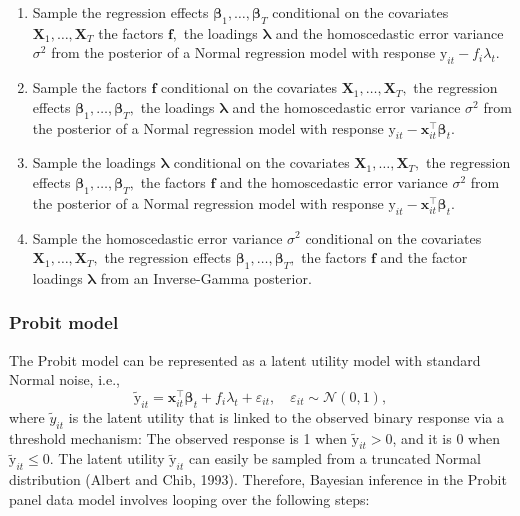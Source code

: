\documentclass[a4paper, preprint, 3p,
authoryear]{elsarticle} %
\begin{document}
\begin{enumerate}
    \item Sample the regression effects $\boldsymbol{\beta}_1,\dots,\boldsymbol{\beta}_T$ conditional on the covariates $\textbf{X}_1,\dots,\textbf{X}_T$ the factors $\mathbf{f},$ the loadings $\boldsymbol{\lambda}$ and the homoscedastic error variance $\sigma^2$ from the posterior of a Normal regression model with response $\text{y}_{it}-f_i\lambda_t.$
    \item Sample the factors $\mathbf{f}$ conditional on the covariates $\textbf{X}_1,\dots,\textbf{X}_T,$ the regression effects $\boldsymbol{\beta}_1,\dots,\boldsymbol{\beta}_T,$ the loadings $\boldsymbol{\lambda}$ and the homoscedastic error variance $\sigma^2$ from the posterior of a Normal regression model with response  $\text{y}_{it}-\textbf{x}_{it}^\top \boldsymbol{\beta}_t$.
    \item Sample the loadings $\boldsymbol{\lambda}$ conditional on the covariates $\textbf{X}_1,\dots,\textbf{X}_T,$ the regression effects $\boldsymbol{\beta}_1,\dots,\boldsymbol{\beta}_T,$ the factors $\mathbf{f}$ and the homoscedastic error variance $\sigma^2$ from the posterior of a Normal regression model with response  $\text{y}_{it}-\textbf{x}_{it}^\top \boldsymbol{\beta}_t.$
     \item Sample the homoscedastic error variance $\sigma^2$ conditional on the covariates $\textbf{X}_1,\dots,\textbf{X}_T,$ the regression effects $\boldsymbol{\beta}_1,\dots,\boldsymbol{\beta}_T,$ the factors $\mathbf{f}$ and the factor loadings $\boldsymbol{\lambda}$ from an Inverse-Gamma posterior.
\end{enumerate}

\subsubsection{Probit model}\label{probit-model}

The Probit model can be represented as a latent utility model with
standard Normal noise, i.e., \begin{equation*}
  \tilde{\text{y}}_{it} = \textbf{x}_{it}^\top \boldsymbol{\beta}_t + f_i\lambda_t + \varepsilon_{it}, \quad \varepsilon_{it} \sim \mathcal{N}(0,1),
\end{equation*} where \(\tilde{y}_{it}\) is the latent utility that is
linked to the observed binary response via a threshold mechanism: The
observed response is 1 when \(\tilde{\text{y}}_{it} > 0\), and it is 0
when \(\tilde{\text{y}}_{it} \le 0.\) The latent utility
\(\tilde{\text{y}}_{it}\) can easily be sampled from a truncated Normal
distribution (Albert and Chib, 1993). Therefore, Bayesian inference in
the Probit panel data model involves looping over the following steps:
\end{document}
